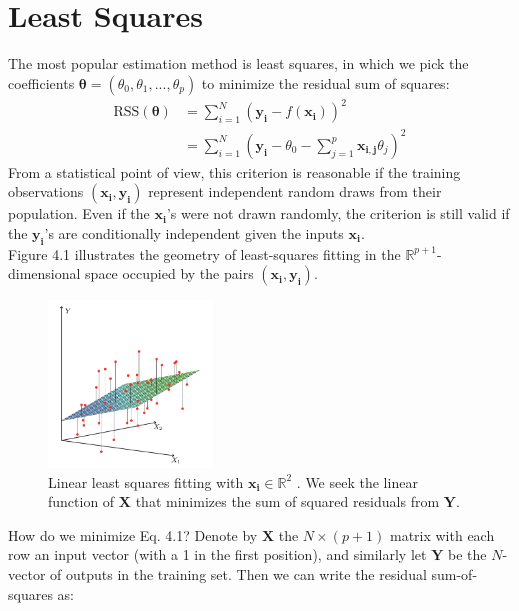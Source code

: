 \documentclass[twoside]{article}
\begin{document}
\section{Least Squares}
The most popular estimation method is least squares, in which we pick the coefficients $\boldsymbol{\theta} = (\theta_0, \theta_1, ..., \theta_p)$ to minimize the residual sum of squares:
\begin{equation}
\begin{aligned}
    \text{RSS}(\boldsymbol{\theta}) &= \sum\limits_{i = 1}^{N}(\boldsymbol{y_i} - f(\boldsymbol{x_i}))^2\\
    &= \sum\limits_{i = 1}^{N}(\boldsymbol{y_i} - \theta_0 - \sum\limits_{j = 1}^{p}\boldsymbol{x_{i, j}}\theta_j)^2
\end{aligned}
\end{equation}
From a statistical point of view, this criterion is reasonable if the training observations $(\boldsymbol{x_i}, \boldsymbol{y_i})$ represent independent random draws from their population. Even if the $\boldsymbol{x_i}$’s were not drawn randomly, the criterion is still valid
if the $\boldsymbol{y_i}$’s are conditionally independent given the inputs $\boldsymbol{x_i}$.\\
Figure 4.1 illustrates the geometry of least-squares fitting in the $\mathbb{R}^{p + 1}$-dimensional space occupied by the pairs $(\boldsymbol{x_i}, \boldsymbol{y_i})$.
\begin{figure}[ht]
\caption{Linear least squares fitting with $\boldsymbol{x_i} \in \mathbb{R}^2$ . We seek the linear function of $\boldsymbol{X}$ that minimizes the sum of squared residuals from $\boldsymbol{Y}$.}
\centering
\includegraphics[width=0.39\textwidth]{img/least_squares.png}
\end{figure}
\newpage
How do we minimize Eq. 4.1? Denote by $\boldsymbol{X}$ the $N \times (p + 1)$ matrix with each row an input vector (with a 1 in the first position), and similarly let $\boldsymbol{Y}$ be the $N$-vector of outputs in the training set. Then we can write the residual sum-of-squares as:
\end{document}
